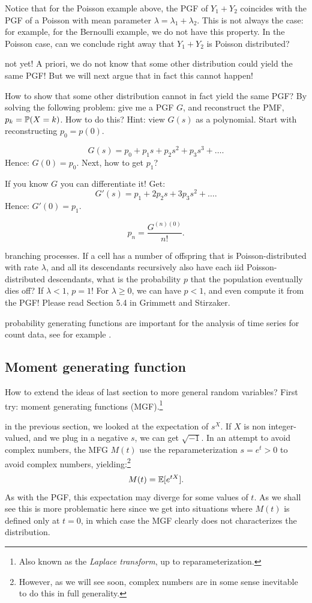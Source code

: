 \documentclass{article}
\begin{document}
 Notice that for the Poisson example above, the PGF of $Y_1 + Y_2$ coincides with the PGF of a Poisson with mean parameter $\lambda = \lambda_1+\lambda_2$. This is not always the case: for example, for the Bernoulli example, we do not have this property. In the Poisson case, can we conclude right away that $Y_1 + Y_2$ is Poisson distributed? 

 not yet! A priori, we do not know that some other distribution could yield the same PGF! But we will next argue that in fact this cannot happen!

 How to show that some other distribution cannot in fact yield the same PGF? By solving the following problem: give me a PGF $G$, and reconstruct the PMF, $p_k = \P(X = k)$. How to do this? Hint: view $G(s)$ as a polynomial. Start with reconstructing $p_0 = p(0)$.

 \[ G(s) = p_0 + p_1 s + p_2 s^2 + p_3 s^3 + \dots. \]
Hence: $G(0) = p_0$. Next, how to get $p_1$?

 If you know $G$ you can differentiate it! Get:
\[ G'(s) = p_1 + 2 p_2 s + 3 p_3 s^2 + \dots. \]
Hence: $G'(0) = p_1$.

 \[ p_n = \frac{G^{(n)(0)}}{n!}. \]

 branching processes. If a cell has a number of offspring that is Poisson-distributed with rate $\lambda$, and all its descendants recursively also have each iid Poisson-distributed descendants, what is the probability $p$ that the population eventually dies off? If $\lambda < 1$, $p=1$! For $\lambda \ge 0$, we can have $p < 1$, and even compute it from the PGF! Please read Section 5.4 in Grimmett and Stirzaker. 

  probability generating functions are important for the analysis of time series for count data, see for example \cite{zhu_negative_2010}.


\subsection{Moment generating function}

How to extend the ideas of last section to more general random variables? First try: moment generating functions (MGF).\footnote{Also known as the \emph{Laplace transform}, up to reparameterization.}

 in the previous section, we looked at the expectation of $s^X$. If $X$ is non integer-valued, and we plug in a negative $s$, we can get $\sqrt{-1}$. In an attempt to avoid complex numbers, the MFG $M(t)$ use the reparameterization $s = e^t > 0$ to avoid complex numbers, yielding:\footnote{However, as we will see soon, complex numbers are in some sense inevitable to do this in full generality.}
\[ M(t) = \E[e^{tX}]. \]
As with the PGF, this expectation may diverge for some values of $t$. As we shall see this is more problematic here since we get into situations where $M(t)$ is defined only at $t=0$, in which case the MGF clearly does not characterizes the distribution.
\end{document}
